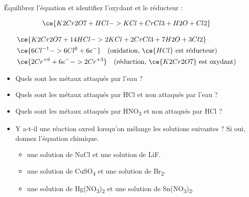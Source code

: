 \documentclass[
  11pt,
  a4paper,
  openany]{book}
\providecommand{\tightlist}{%
  \setlength{\itemsep}{0pt}\setlength{\parskip}{0pt}}
\begin{document}
\begin{Exercise}
Équilibrez l'équation et identifiez l'oxydant et le réducteur :

\[
\ce{K2Cr2O7 + HCl -> KCl + CrCl3 + H2O + Cl2}
\]

\end{Exercise}

\begin{Answer}
\[
\begin{split}
& \ce{K2Cr2O7 + 14 HCl -> 2 KCl + 2 CrCl3 + 7 H2O + 3 Cl2} \\
& \ce{ 6 Cl^{-1} -> 6 Cl^{0} + 6 e^-} \quad \text{(oxidation, $\ce{HCl}$ est réducteur)} \\
& \ce{ 2 Cr^{+6} + 6 e^- -> 2 Cr^{+3}} \quad \text{(réduction, $\ce{K2Cr2O7}$ est oxydant)}
\end{split}
\]

\end{Answer}

\begin{Exercise}

\begin{itemize}
\tightlist
\item
  Quels sont les métaux attaqués par l'eau ?
\item
  Quels sont les métaux attaqués par HCl et non attaqués par l'eau ?
\item
  Quels sont les métaux attaqués par HNO\textsubscript{3} et non attaqués par HCl ?
\item
  Y a-t-il une réaction oxred lorsqu'on mélange les solutions suivantes ? Si oui, donnez l'équation chimique.

  \begin{itemize}
  \tightlist
  \item
    une solution de NaCl et une solution de LiF.
  \item
    une solution de CuSO\textsubscript{4} et une solution de Br\textsubscript{2}.
  \item
    une solution de Hg(NO\textsubscript{3})\textsubscript{2} et une solution de Sn(NO\textsubscript{3})\textsubscript{2}.
  \end{itemize}
\end{itemize}

\end{Exercise}
\end{document}
